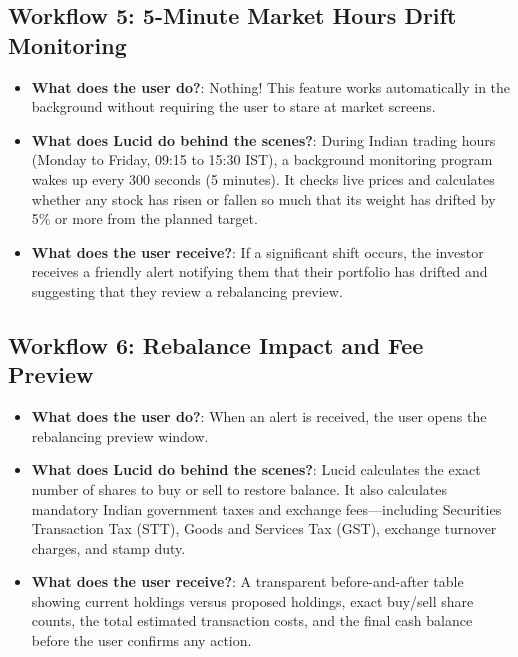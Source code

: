 \subsection{Workflow 5: 5-Minute Market Hours Drift Monitoring}
\begin{itemize}
    \item \textbf{What does the user do?}: Nothing! This feature works automatically in the background without requiring the user to stare at market screens.
    \item \textbf{What does Lucid do behind the scenes?}: During Indian trading hours (Monday to Friday, 09:15 to 15:30 IST), a background monitoring program wakes up every 300 seconds (5 minutes). It checks live prices and calculates whether any stock has risen or fallen so much that its weight has drifted by 5\% or more from the planned target.
    \item \textbf{What does the user receive?}: If a significant shift occurs, the investor receives a friendly alert notifying them that their portfolio has drifted and suggesting that they review a rebalancing preview.
\end{itemize}

\subsection{Workflow 6: Rebalance Impact and Fee Preview}
\begin{itemize}
    \item \textbf{What does the user do?}: When an alert is received, the user opens the rebalancing preview window.
    \item \textbf{What does Lucid do behind the scenes?}: Lucid calculates the exact number of shares to buy or sell to restore balance. It also calculates mandatory Indian government taxes and exchange fees—including Securities Transaction Tax (STT), Goods and Services Tax (GST), exchange turnover charges, and stamp duty.
    \item \textbf{What does the user receive?}: A transparent before-and-after table showing current holdings versus proposed holdings, exact buy/sell share counts, the total estimated transaction costs, and the final cash balance before the user confirms any action.
\end{itemize}

